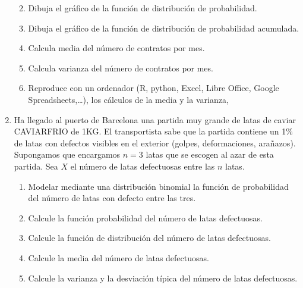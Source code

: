 \documentclass[
]{article}
\providecommand{\tightlist}{%
  \setlength{\itemsep}{0pt}\setlength{\parskip}{0pt}}
\begin{document}
\begin{enumerate}
  \begin{enumerate}
  \def\labelenumii{\alph{enumii}.}
  \tightlist
  \item
    Dibuja el gráfico de la función de distribución de probabilidad.
  \item
    Dibuja el gráfico de la función de distribución de probabilidad
    acumulada.
  \item
    Calcula media del número de contratos por mes.
  \item
    Calcula varianza del número de contratos por mes.
  \item
    Reproduce con un ordenador (R, python, Excel, Libre Office, Google
    Spreadsheets,\ldots), los cálculos de la media y la varianza,
  \end{enumerate}
\item
  Ha llegado al puerto de Barcelona una partida muy grande de latas de
  caviar CAVIARFRIO de 1KG. El transportista sabe que la partida
  contiene un 1\% de latas con defectos visibles en el exterior (golpes,
  deformaciones, arañazos). Supongamos que encargamos \(n=3\) latas que
  se escogen al azar de esta partida. Sea \(X\) el número de latas
  defectuosas entre las \(n\) latas.

  \begin{enumerate}
  \def\labelenumii{\alph{enumii}.}
  \tightlist
  \item
    Modelar mediante una distribución binomial la función de
    probabilidad del número de latas con defecto entre las tres.
  \item
    Calcule la función probabilidad del número de latas defectuosas.
  \item
    Calcule la función de distribución del número de latas defectuosas.
  \item
    Calcule la media del número de latas defectuosas.
  \item
    Calcule la varianza y la desviación típica del número de latas
    defectuosas.
  \end{enumerate}
\end{enumerate}

\newpage
\end{document}
